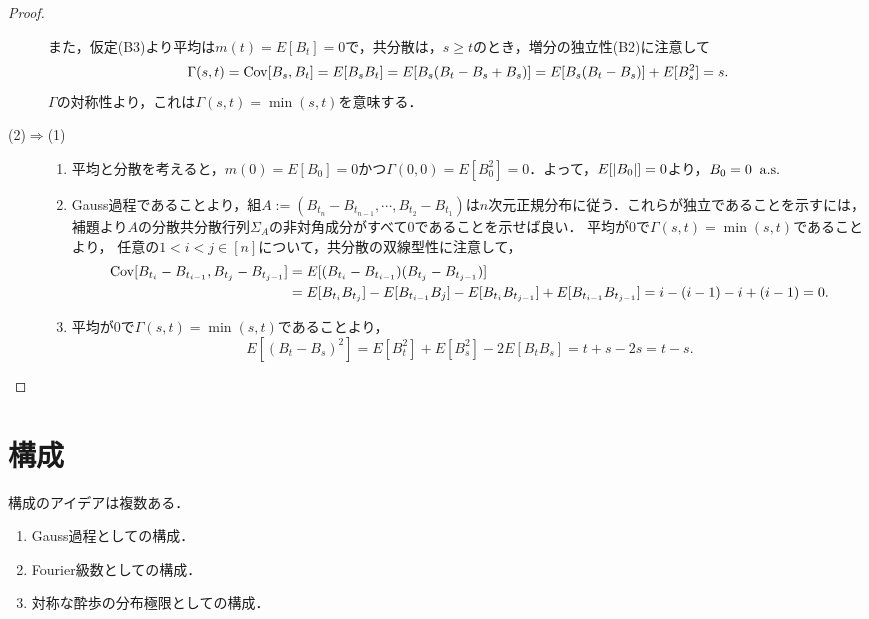 \documentclass[uplatex,dvipdfmx]{jsreport}
\begin{document}
\begin{proof}
\begin{description}
        また，仮定(B3)より平均は$m(t)=E[B_t]=0$で，共分散は，$s\ge t$のとき，増分の独立性(B2)に注意して
        \[\Gamma(s,t)=\mathrm{Cov}[B_s,B_t]=E[B_sB_t]=E[B_s(B_t-B_s+B_s)]=E[B_s(B_t-B_s)]+E[B_s^2]=s.\]
        $\Gamma$の対称性より，これは$\Gamma(s,t)=\min(s,t)$を意味する．
        \item[(2)$\Rightarrow$(1)]
        \begin{enumerate}[({B}1)]
            \item 平均と分散を考えると，$m(0)=E[B_0]=0$かつ$\Gamma(0,0)=E[B_0^2]=0$．よって，$E[\lvert B_0\rvert]=0$より，$B_0=0\;\;\mathrm{a.s.}$
            \item Gauss過程であることより，組$A:=(B_{t_n}-B_{t_{n-1}},\cdots,B_{t_2}-B_{t_1})$は$n$次元正規分布に従う．これらが独立であることを示すには，補題より$A$の分散共分散行列$\Sigma_A$の非対角成分がすべて$0$であることを示せば良い．
            平均が$0$で$\Gamma(s,t)=\min(s,t)$であることより，
            任意の$1<i< j\in[n]$について，共分散の双線型性に注意して，
            \begin{align*}
                \mathrm{Cov}[B_{t_i}-B_{t_{i-1}},B_{t_j}-B_{t_{j-1}}]&=E[(B_{t_i}-B_{t_{i-1}})(B_{t_j}-B_{t_{j-1}})]\\
                &=E[B_{t_i}B_{t_j}]-E[B_{t_{i-1}}B_j]-E[B_{t_i}B_{t_{j-1}}]+E[B_{t_{i-1}}B_{t_{j-1}}]=i-(i-1)-i+(i-1)=0.
            \end{align*}
            \item 平均が$0$で$\Gamma(s,t)=\min(s,t)$であることより，
            \[E[(B_t-B_s)^2]=E[B_t^2]+E[B_s^2]-2E[B_tB_s]=t+s-2s=t-s.\]
        \end{enumerate}
    \end{description}
\end{proof}

\section{構成}

\begin{tcolorbox}[colframe=ForestGreen, colback=ForestGreen!10!white,breakable,colbacktitle=ForestGreen!40!white,coltitle=black,fonttitle=\bfseries\sffamily,
    title=]
    構成のアイデアは複数ある．
    \begin{enumerate}
        \item Gauss過程としての構成．
        \item Fourier級数としての構成．
        \item 対称な酔歩の分布極限としての構成．
    \end{enumerate}
\end{tcolorbox}
\end{document}
